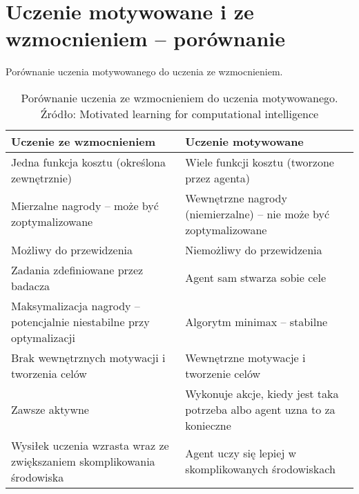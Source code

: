 \chapter{Uczenie motywowane i ze wzmocnieniem -- porównanie}
\label{cha:rozdzial4}

Porównanie uczenia motywowanego do uczenia ze wzmocnieniem.
\begin{table}[H]
	\centering
	\caption{Porównanie uczenia ze wzmocnieniem do uczenia motywowanego. 
		Źródło: Motivated learning for computational intelligence}
	\begin{tabular}{|p{}|p{}|}
		\hline
		\textbf{Uczenie ze wzmocnieniem} & \textbf{Uczenie motywowane} \\
		\hline
		Jedna funkcja kosztu (określona zewnętrznie) & Wiele funkcji kosztu 
		(tworzone przez agenta) \\
		\hline
		Mierzalne nagrody -- może być zoptymalizowane & Wewnętrzne nagrody 
		(niemierzalne) -- nie może być zoptymalizowane \\
		\hline
		Możliwy do przewidzenia & Niemożliwy do przewidzenia \\
		\hline
		Zadania zdefiniowane przez badacza & Agent sam stwarza sobie cele \\
		\hline
		Maksymalizacja nagrody -- potencjalnie niestabilne przy optymalizacji & 
		Algorytm minimax -- stabilne \\
		\hline
		Brak wewnętrznych motywacji i tworzenia celów & Wewnętrzne motywacje 
		i tworzenie celów \\
		\hline
		Zawsze aktywne & Wykonuje akcje, kiedy jest taka potrzeba albo agent 
		uzna 
		to za konieczne \\
		\hline
		Wysiłek uczenia wzrasta wraz ze zwiększaniem skomplikowania środowiska 
		& 
		Agent uczy się lepiej w skomplikowanych środowiskach \\
		\hline
	\end{tabular}
\end{table}
